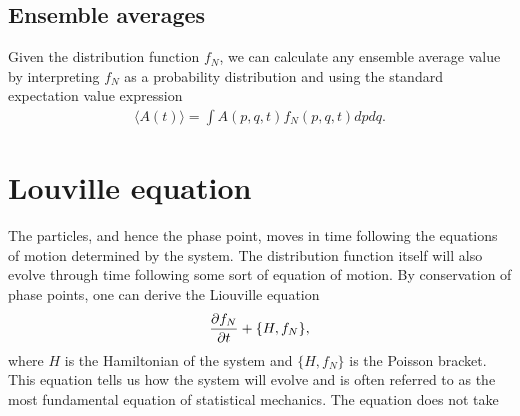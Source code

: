 \subsection{Ensemble averages}
Given the distribution function $f_N$, we can calculate any ensemble average value by interpreting $f_N$ as a probability distribution and using the standard expectation value expression
\begin{align}
	\langle A(t) \rangle = \int A(p, q, t)f_N(p, q, t)dpdq.
\end{align}

\section{Louville equation}
The particles, and hence the phase point, moves in time following the equations of motion determined by the system. The distribution function itself will also evolve through time following some sort of equation of motion. By conservation of phase points, one can derive the Liouville equation
\begin{align}
	\frac{\partial f_N}{\partial t} + \{H, f_N\},
\end{align}
where $H$ is the Hamiltonian of the system and $\{H, f_N\}$ is the Poisson bracket. This equation tells us how the system will evolve and is often referred to as the most fundamental equation of statistical mechanics. The equation does not take 

